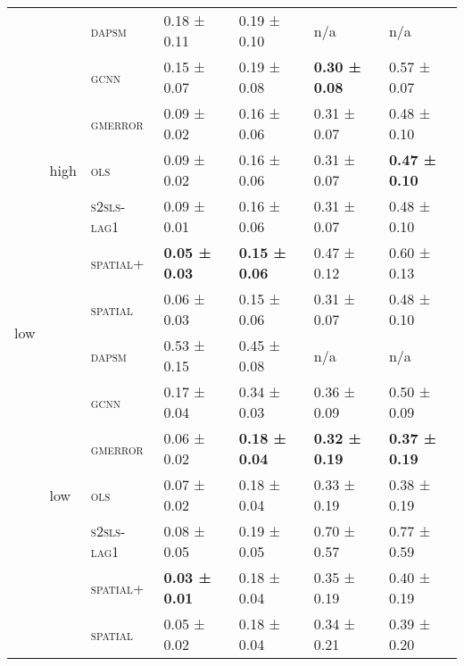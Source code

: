 \documentclass{article}
\begin{document}
\begin{table}[!tbp]
\begin{tabular}{lllllll}
\cline{1-7} \cline{2-7}
\multirow[t]{14}{*}{low} & \multirow[t]{7}{*}{high} & \textsc{dapsm} & 0.18 ± {\small 0.11} & 0.19 ± {\small 0.10} & n/a & n/a \\
 &  & \textsc{gcnn} & 0.15 ± {\small 0.07} & 0.19 ± {\small 0.08} & \bf 0.30 ± {\small 0.08} & 0.57 ± {\small 0.07} \\
 &  & \textsc{gmerror} & 0.09 ± {\small 0.02} & 0.16 ± {\small 0.06} & 0.31 ± {\small 0.07} & 0.48 ± {\small 0.10} \\
 &  & \textsc{ols} & 0.09 ± {\small 0.02} & 0.16 ± {\small 0.06} & 0.31 ± {\small 0.07} & \bf 0.47 ± {\small 0.10} \\
 &  & \textsc{s2sls-lag1} & 0.09 ± {\small 0.01} & 0.16 ± {\small 0.06} & 0.31 ± {\small 0.07} & 0.48 ± {\small 0.10} \\
 &  & \textsc{spatial+} & \bf 0.05 ± {\small 0.03} & \bf 0.15 ± {\small 0.06} & 0.47 ± {\small 0.12} & 0.60 ± {\small 0.13} \\
 &  & \textsc{spatial} & 0.06 ± {\small 0.03} & 0.15 ± {\small 0.06} & 0.31 ± {\small 0.07} & 0.48 ± {\small 0.10} \\
\cline{2-7}
 & \multirow[t]{7}{*}{low} & \textsc{dapsm} & 0.53 ± {\small 0.15} & 0.45 ± {\small 0.08} & n/a & n/a \\
 &  & \textsc{gcnn} & 0.17 ± {\small 0.04} & 0.34 ± {\small 0.03} & 0.36 ± {\small 0.09} & 0.50 ± {\small 0.09} \\
 &  & \textsc{gmerror} & 0.06 ± {\small 0.02} & \bf 0.18 ± {\small 0.04} & \bf 0.32 ± {\small 0.19} & \bf 0.37 ± {\small 0.19} \\
 &  & \textsc{ols} & 0.07 ± {\small 0.02} & 0.18 ± {\small 0.04} & 0.33 ± {\small 0.19} & 0.38 ± {\small 0.19} \\
 &  & \textsc{s2sls-lag1} & 0.08 ± {\small 0.05} & 0.19 ± {\small 0.05} & 0.70 ± {\small 0.57} & 0.77 ± {\small 0.59} \\
 &  & \textsc{spatial+} & \bf 0.03 ± {\small 0.01} & 0.18 ± {\small 0.04} & 0.35 ± {\small 0.19} & 0.40 ± {\small 0.19} \\
 &  & \textsc{spatial} & 0.05 ± {\small 0.02} & 0.18 ± {\small 0.04} & 0.34 ± {\small 0.21} & 0.39 ± {\small 0.20} \\
\cline{1-7} \cline{2-7}
\bottomrule
\end{tabular}

\end{table}
\end{document}
